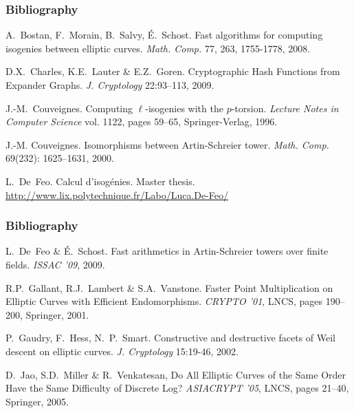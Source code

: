 \documentclass[10pt]{beamer}
\newcommand{\0}{\mathcal{O}}  %
\begin{document}
\begin{frame}
  \frametitle{Bibliography}

  \begin{thebibliography}{1}
    \beamertemplatearticlebibitems
    
   A.~Bostan,
    F.~Morain, B.~Salvy, É.~Schost.  \newblock Fast algorithms for
    computing isogenies between elliptic curves.
    \newblock \emph{Math. Comp.} 77, 263, 1755-1778, 2008.
    
    D.X.~Charles, K.E.~Lauter \& E.Z.~Goren.
    \newblock Cryptographic Hash Functions from Expander Graphs.
    \newblock \emph{J. Cryptology} 22:93--113, 2009.
    
  J.-M.~Couveignes.
    \newblock Computing $\ell$-isogenies with the $p$-torsion.
    \newblock \emph{Lecture Notes in Computer Science} vol. 1122, pages 59--65,
    Springer-Verlag, 1996.
    
   J.-M. Couveignes.
    \newblock Isomorphisms between {A}rtin-{S}chreier tower.
    \newblock \emph{Math. Comp.} 69(232): 1625--1631, 2000.

   L.~De~Feo.  \newblock Calcul d'isogénies.
    \newblock Master
    thesis. \url{http://www.lix.polytechnique.fr/Labo/Luca.De-Feo/}

  \end{thebibliography}
\end{frame}


\begin{frame}
  \frametitle{Bibliography}

  \begin{thebibliography}{1}

   L.~De~Feo \& É.~Schost.  \newblock
    Fast arithmetics in Artin-Schreier towers over finite fields.
    \newblock \emph{ISSAC '09}, 2009.

    R.P.~Gallant, R.J.~Lambert \& S.A.~Vanstone.
    \newblock Faster Point Multiplication on Elliptic Curves
    with Efficient Endomorphisms.
    \newblock \emph{CRYPTO '01}, LNCS, pages 190--200, Springer, 2001.
    
    P.~Gaudry, F.~Hess, N.~P.~Smart.
    \newblock Constructive and destructive facets of Weil
    descent on elliptic curves.
    \newblock \emph{J. Cryptology} 15:19-46, 2002.

    D.~Jao, S.D.~Miller \& R.~Venkatesan,
    \newblock Do All Elliptic Curves of the Same Order Have the Same 
    Difficulty of Discrete Log?
    \newblock \emph{ASIACRYPT '05}, LNCS, pages 21--40, Springer, 2005.

  \end{thebibliography}
\end{frame}
\end{document}
